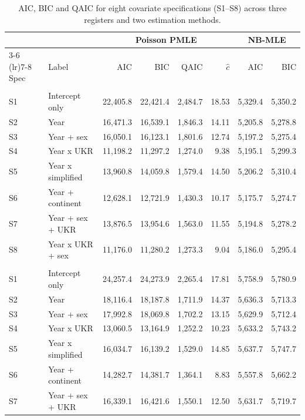 \begin{table}[ht!]
\caption{\label{tbl-full-aic}AIC, BIC and QAIC for eight covariate specifications (S1--S8) across three registers and two estimation methods.} 
\fontsize{8.0pt}{10.0pt}\selectfont
\begin{tabular*}{\linewidth}{@{\extracolsep{\fill}}llrrrrrr}
\toprule
 &  & \multicolumn{4}{c}{{Poisson PMLE}} & \multicolumn{2}{c}{{NB-MLE}} \\ 
\cmidrule(lr){3-6} \cmidrule(lr){7-8}
Spec & Label & AIC & BIC & QAIC & $\hat c$ & AIC & BIC \\ 
\midrule\addlinespace[2.5pt]
\multicolumn{8}{l}{ZUS} \\[2.5pt] 
\midrule\addlinespace[2.5pt]
S1 & Intercept only & 22,405.8 & 22,421.4 & 2,484.7 & 18.53 & 5,329.4 & 5,350.2 \\ 
S2 & Year & 16,471.3 & 16,539.1 & 1,846.3 & 14.11 & 5,205.8 & 5,278.8 \\ 
S3 & Year + sex & 16,050.1 & 16,123.1 & 1,801.6 & 12.74 & 5,197.2 & 5,275.4 \\ 
S4 & Year x UKR & 11,198.2 & 11,297.2 & 1,274.0 & 9.38 & 5,195.1 & 5,299.3 \\ 
S5 & Year x simplified & 13,960.8 & 14,059.8 & 1,579.4 & 14.50 & 5,206.2 & 5,310.4 \\ 
S6 & Year + continent & 12,628.1 & 12,721.9 & 1,430.3 & 10.17 & 5,175.7 & 5,274.7 \\ 
S7 & Year + sex + UKR & 13,876.5 & 13,954.6 & 1,563.0 & 11.55 & 5,194.8 & 5,278.2 \\ 
S8 & Year x UKR + sex & 11,176.0 & 11,280.2 & 1,273.3 & 9.04 & 5,186.0 & 5,295.4 \\ 
\midrule\addlinespace[2.5pt]
\multicolumn{8}{l}{Tax} \\[2.5pt] 
\midrule\addlinespace[2.5pt]
S1 & Intercept only & 24,257.4 & 24,273.9 & 2,265.4 & 17.81 & 5,758.9 & 5,780.9 \\ 
S2 & Year & 18,116.4 & 18,187.8 & 1,711.9 & 14.37 & 5,636.3 & 5,713.3 \\ 
S3 & Year + sex & 17,992.8 & 18,069.8 & 1,702.2 & 13.15 & 5,629.9 & 5,712.4 \\ 
S4 & Year x UKR & 13,060.5 & 13,164.9 & 1,252.2 & 10.23 & 5,633.2 & 5,743.2 \\ 
S5 & Year x simplified & 16,034.7 & 16,139.2 & 1,529.0 & 14.85 & 5,637.7 & 5,747.7 \\ 
S6 & Year + continent & 14,282.7 & 14,381.7 & 1,364.1 & 8.83 & 5,557.8 & 5,662.2 \\ 
S7 & Year + sex + UKR & 16,339.1 & 16,421.6 & 1,550.1 & 12.50 & 5,631.7 & 5,719.7 \\ 

\end{tabular*}
\end{table}
